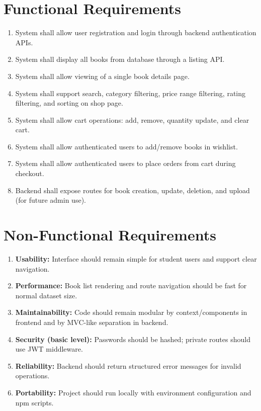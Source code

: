 \documentclass[12pt,a4paper]{report}
\begin{document}
\section{Functional Requirements}
\begin{enumerate}[label=\arabic*.]
    \item System shall allow user registration and login through backend authentication APIs.
    \item System shall display all books from database through a listing API.
    \item System shall allow viewing of a single book details page.
    \item System shall support search, category filtering, price range filtering, rating filtering, and sorting on shop page.
    \item System shall allow cart operations: add, remove, quantity update, and clear cart.
    \item System shall allow authenticated users to add/remove books in wishlist.
    \item System shall allow authenticated users to place orders from cart during checkout.
    \item Backend shall expose routes for book creation, update, deletion, and upload (for future admin use).
\end{enumerate}

\section{Non-Functional Requirements}
\begin{enumerate}[label=\arabic*.]
    \item \textbf{Usability:} Interface should remain simple for student users and support clear navigation.
    \item \textbf{Performance:} Book list rendering and route navigation should be fast for normal dataset size.
    \item \textbf{Maintainability:} Code should remain modular by context/components in frontend and by MVC-like separation in backend.
    \item \textbf{Security (basic level):} Passwords should be hashed; private routes should use JWT middleware.
    \item \textbf{Reliability:} Backend should return structured error messages for invalid operations.
    \item \textbf{Portability:} Project should run locally with environment configuration and npm scripts.
\end{enumerate}
\end{document}
